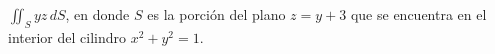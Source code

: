 \item $\iint_S yz \, dS$, en donde $S$ es la porción del plano $z = y + 3$ que se encuentra en el interior del cilindro $x^2 + y^2 = 1$.
